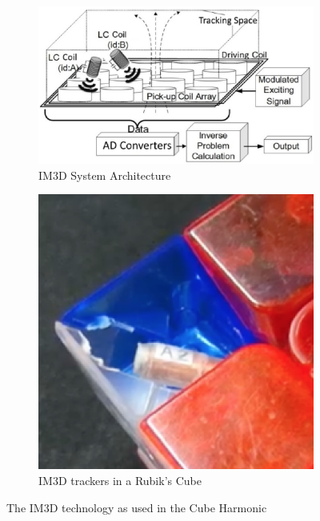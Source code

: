 \begin{figure}
    \centering
    \begin{subfigure}{0.60\textwidth}
        \centering
        \includegraphics[width=.90\linewidth]{Figures/3 State of the Art/im3d.png}
        \caption{IM3D System Architecture \cite{im3d}}
        \label{fig:im3d-architecture}
    \end{subfigure}%
    \begin{subfigure}{0.40\textwidth}
        \centering
        \includegraphics[width=.90\linewidth]{Figures/3 State of the Art/cubeharmonic-2019-tags.png}
        \caption{IM3D trackers in a Rubik's Cube \cite{mannone-cubeharmonic-2019}}
        \label{fig:cubeharmonic-trackers}
    \end{subfigure}%
    \caption{The IM3D technology as used in the Cube Harmonic}
    \label{fig:cubeharmonic-im3d}
\end{figure}

